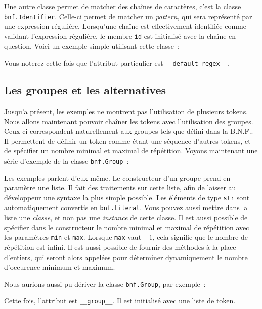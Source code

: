\documentclass[a4paper]{article}
\newcommand{\insertpython}[1]{%
{\ttfamily}%
}
\newcommand{\fixed}[1]{\texttt{#1}}
\newcommand{\bnf}{B.N.F.}
\begin{document}
            Une autre classe permet de matcher des chaînes de caractères,
            c'est la classe \fixed{bnf.Identifier}. Celle-ci permet de
            matcher un \emph{pattern}, qui sera représenté par une expression
            régulière. Lorsqu'une chaîne est effectivement identifiée comme
            validant l'expression régulière, le membre \fixed{id} est
            initialisé avec la chaîne en question.
            Voici un exemple simple utilisant cette classe~:
            \insertpython{listings/bnf/ex03.py}

            Vous noterez cette fois que l'attribut particulier est
            \fixed{\_\_default\_regex\_\_}.

        \subsection{Les groupes et les alternatives}
            Jusqu'a présent, les exemples ne montrent pas l'utilisation de
            plusieurs tokens. Nous allons maintenant pouvoir chaîner les
            tokens avec l'utilisation des groupes. Ceux-ci correspondent
            naturellement aux groupes tels que défini dans la \bnf. Il
            permettent de définir un token comme étant une séquence d'autres
            tokens, et de spécifier un nombre minimal et maximal de répétition.
            Voyons maintenant une série d'exemple de la classe \fixed{bnf.Group}~:
            \insertpython{listings/bnf/ex04.py}

            Les exemples parlent d'eux-même. Le constructeur d'un groupe prend
            en paramètre une liste. Il fait des traitements sur cette liste,
            afin de laisser au développeur une syntaxe la plus simple possible.
            Les éléments de type \fixed{str} sont automatiquement convertis en
            \fixed{bnf.Literal}. Vous pouvez aussi mettre dans la liste une
            \emph{classe}, et non pas une \emph{instance} de cette classe.
            Il est aussi possible de spécifier dans le constructeur le
            nombre minimal et maximal de répétition avec les paramètres \fixed{min}
            et \fixed{max}. Lorsque \fixed{max}
            vaut $-1$, cela signifie que le nombre de répétition est infini.
            Il est aussi possible de fournir des méthodes à la place d'entiers,
            qui seront alors appelées pour déterminer dynamiquement le nombre
            d'occurence minimum et maximum.


            Nous aurions aussi pu dériver la classe \fixed{bnf.Group}, par
            exemple~:
            \insertpython{listings/bnf/ex06.py}
            Cette fois, l'attribut est \fixed{\_\_group\_\_}. Il est initialisé
            avec une liste de token.
\end{document}
